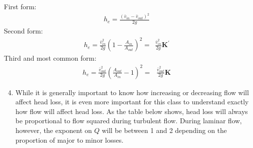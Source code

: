 \documentclass[letterpaper,10pt,english]{sphinxmanual}
\begin{document}
First form:
\begin{equation}\label{equation:Fluids_Review/Fluids_Review_Design:Fluids_Review/Fluids_Review_Design:38}
\begin{split}h_e = \frac{\left( \bar v_{in}  - \bar v_{out} \right)^2}{2g}\end{split}
\end{equation}
Second form:
\begin{equation}\label{equation:Fluids_Review/Fluids_Review_Design:Fluids_Review/Fluids_Review_Design:39}
\begin{split}h_e = \frac{\bar v_{in}^2}{2g}{\left( {1 - \frac{A_{in}}{A_{out}}} \right)^2} = \,\,\, \frac{\bar v_{in}^2}{2g} \mathbf{K^{'}}\end{split}
\end{equation}
Third and most common form:
\begin{equation}\label{equation:Fluids_Review/Fluids_Review_Design:Fluids_Review/Fluids_Review_Design:40}
\begin{split}h_e = \frac{\bar v_{out}^2}{2g}{\left( {\frac{A_{out}}{A_{in}}} -1 \right)^2} = \,\,\,\, \frac{\bar v_{out}^2}{2g} \mathbf{K}\end{split}
\end{equation}\begin{enumerate}
\setcounter{enumi}{3}
\item {} 
 While it is generally important to know how increasing or decreasing flow will affect head loss, it is even more important for this class to understand exactly how flow will affect head loss. As the table below shows, head loss will always be proportional to flow squared during turbulent flow. During laminar flow, however, the exponent on \(Q\) will be between 1 and 2 depending on the proportion of major to minor losses.

\end{enumerate}
\end{document}
